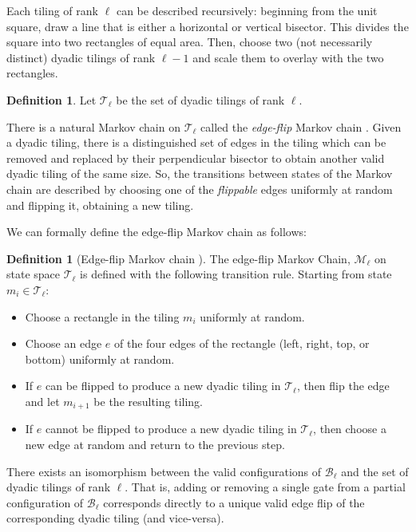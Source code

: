\documentclass[11pt,letterpaper]{article}
\theoremstyle{definition}
\newtheorem{definition}[theorem]{Definition}
\theoremstyle{remark}
\newcommand{\cT}{\mathcal T}
\numberwithin{equation}{section}
\theoremstyle{definition}
\begin{document}
Each tiling of rank $\ell$ can be described recursively: beginning from the unit square, draw a line that is either a horizontal or vertical bisector. This divides the square into two rectangles of equal area.%
Then, choose two (not necessarily distinct) dyadic tilings of rank $\ell-1$ and scale them to overlay with the two rectangles.

\begin{definition}
Let $\cT_{\ell}$ be the set of dyadic tilings of rank $\ell$.
\end{definition}

There is a natural Markov chain on $\cT_{\ell}$ called the \emph{edge-flip} Markov chain \cite{randomdyadictilingsoftheunitsquare}. Given a dyadic tiling, there is a distinguished set of edges in the tiling which can be removed and replaced by their perpendicular bisector to obtain another valid dyadic tiling of the same size. So, the transitions between states of the Markov chain are described by choosing one of the \emph{flippable} edges uniformly at random and flipping it, obtaining a new tiling.

We can formally define the edge-flip Markov chain as follows:

\begin{definition}[Edge-flip Markov chain \cite{randomdyadictilingsoftheunitsquare,cannon_et_al:LIPIcs:2017:7583}]

The edge-flip Markov Chain, $\mathcal{M}_{\ell}$ on state space $\cT_{\ell}$ is defined with the following transition rule. Starting from state $m_i \in \cT_{\ell}$:
\begin{itemize}
  \item Choose a rectangle in the tiling $m_i$ uniformly at random.
  \item Choose an edge $e$ of the four edges of the rectangle (left, right, top, or bottom) uniformly at random.
  \item If $e$ can be flipped to produce a new dyadic tiling in $\cT_{\ell}$, then flip the edge and let $m_{i+1}$ be the resulting tiling.
  \item If $e$ cannot be flipped to produce a new dyadic tiling in $\cT_{\ell}$, then choose a new edge at random and return to the previous step.
\end{itemize}

\end{definition}

There exists an isomorphism between the valid configurations of $\mathcal{B}_{\ell}$ and the set of dyadic tilings of rank $\ell$.%
That is, adding or removing a single gate from a partial configuration of $\mathcal{B}_{\ell}$ corresponds directly to a unique valid edge flip of the corresponding dyadic tiling (and vice-versa).
\end{document}
